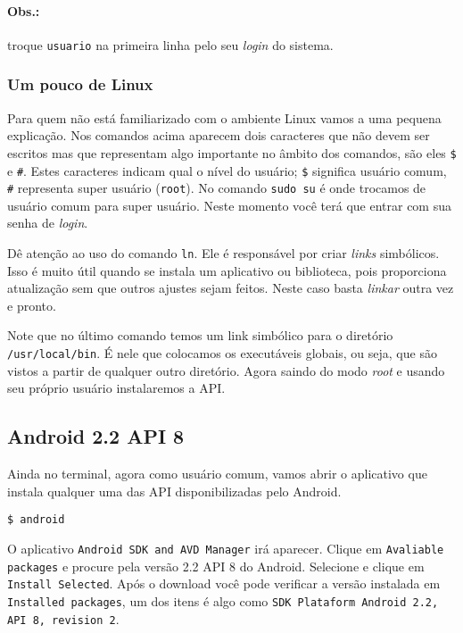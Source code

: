 \paragraph{Obs.:} troque \texttt{usuario} na primeira linha pelo seu \textit{login} do sistema.

\subsubsection{Um pouco de Linux}

Para quem não está familiarizado com o ambiente Linux vamos a uma pequena explicação. Nos comandos
acima aparecem dois caracteres que não devem ser escritos mas que representam algo importante no âmbito
dos comandos, são eles \texttt{\$} e \texttt{\#}. Estes caracteres indicam qual o nível do usuário;
\texttt{\$} significa usuário comum, \texttt{\#} representa super usuário (\texttt{root}). No comando
\texttt{sudo su} é onde trocamos de usuário comum para super usuário. Neste momento você terá que entrar
com sua senha de \textit{login}.

Dê atenção ao uso do comando \texttt{ln}. Ele é responsável por criar \textit{links} simbólicos. Isso é
muito útil quando se instala um aplicativo ou biblioteca, pois proporciona atualização sem que
outros ajustes sejam feitos. Neste caso basta \textit{linkar} outra vez e pronto.

Note que no último comando temos um link simbólico para o diretório \texttt{/usr/local/bin}. É
nele que colocamos os executáveis globais, ou seja, que são vistos a partir de qualquer outro
diretório. Agora saindo do modo \textit{root} e usando seu próprio usuário instalaremos a API.

\subsection{Android 2.2 API 8}

Ainda no terminal, agora como usuário comum, vamos abrir o aplicativo que instala qualquer uma
das API disponibilizadas pelo Android.

\medskip

\begin{flushleft}
\texttt{\$ android}
\end{flushleft}

\medskip

O aplicativo \texttt{Android SDK and AVD Manager} irá aparecer. Clique em \texttt{Avaliable packages}
e procure pela versão 2.2 API 8 do Android. Selecione e clique em \texttt{Install Selected}. Após
o download você pode verificar a versão instalada em \texttt{Installed packages}, um dos itens é
algo como \texttt{SDK Plataform Android 2.2, API 8, revision 2}.

